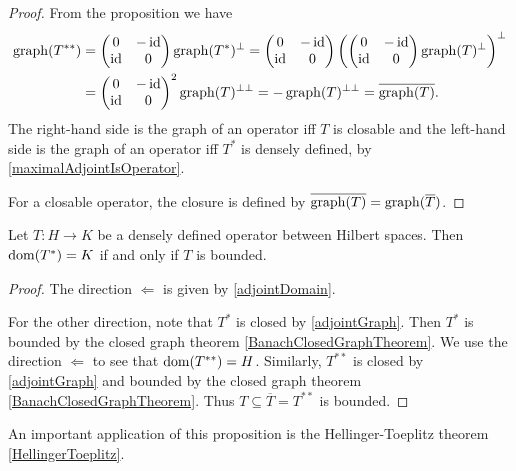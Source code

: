 \begin{proof}
From the proposition we have
\begin{align*}
\operatorname{graph}(T^{**}) &=  \begin{pmatrix}
0 & -\operatorname{id} \\ \operatorname{id} & 0
\end{pmatrix}\operatorname{graph}(T^*)^\perp 
=  \begin{pmatrix}
0 & -\operatorname{id} \\ \operatorname{id} & 0
\end{pmatrix}\left(\begin{pmatrix}
0 & -\operatorname{id} \\ \operatorname{id} & 0
\end{pmatrix}\operatorname{graph}(T)^\perp\right)^\perp \\
&= \begin{pmatrix}
0 & -\operatorname{id} \\ \operatorname{id} & 0
\end{pmatrix}^2\operatorname{graph}(T)^{\perp\perp} = -\operatorname{graph}(T)^{\perp\perp}
= \overline{\operatorname{graph}(T)}.
\end{align*}
The right-hand side is the graph of an operator iff $T$ is closable and the left-hand side is the graph of an operator iff $T^*$ is densely defined, by \ref{maximalAdjointIsOperator}.

For a closable operator, the closure is defined by $\overline{\operatorname{graph}(T)} = \operatorname{graph}(\overline{T})$.
\end{proof}

\begin{proposition} \label{adjointBoundedEverywhereDefined}
Let $T: H\to K$ be a densely defined operator between Hilbert spaces. Then $\operatorname{dom}(T^*) = K$ \textup{if and only if} $T$ is bounded.
\end{proposition}
\begin{proof}
The direction $\Leftarrow$ is given by \ref{adjointDomain}.

For the other direction, note that $T^*$ is closed by \ref{adjointGraph}. Then $T^*$ is bounded by the closed graph theorem \ref{BanachClosedGraphTheorem}. We use the direction $\Leftarrow$ to see that $\operatorname{dom}(T^{**}) = H$. Similarly, $T^{**}$ is closed by \ref{adjointGraph} and bounded by the closed graph theorem \ref{BanachClosedGraphTheorem}. Thus $T\subseteq \overline{T} = T^{**}$ is bounded.
\end{proof}

An important application of this proposition is the Hellinger-Toeplitz theorem \ref{HellingerToeplitz}.

